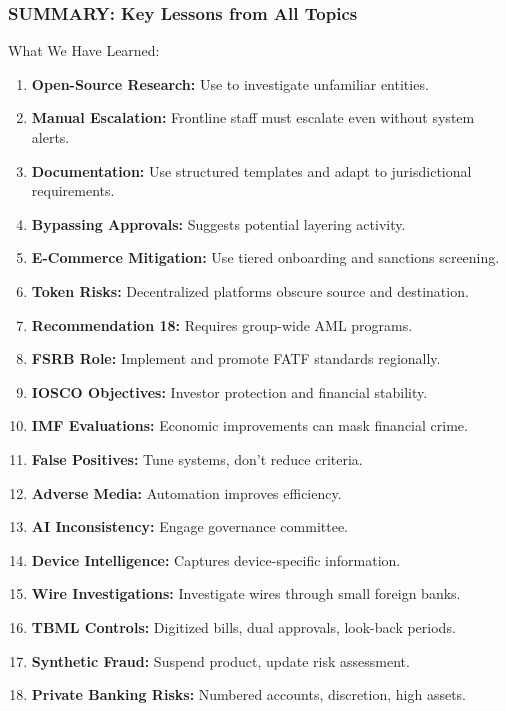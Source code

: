 \documentclass[12pt,aspectratio=169]{beamer}
\renewcommand{\footnotesize}{\fontsize{7}{8}\selectfont}
\renewcommand{\small}{\fontsize{8}{9}\selectfont}
\begin{document}
\begin{frame}
\frametitle{\fontsize{14}{17}\selectfont SUMMARY: Key Lessons from All Topics}

\small
\begin{block}{\fontsize{11}{13}\selectfont What We Have Learned:}
\footnotesize
\begin{enumerate}
    \item \textbf{Open-Source Research:} Use to investigate unfamiliar entities.
    \item \textbf{Manual Escalation:} Frontline staff must escalate even without system alerts.
    \item \textbf{Documentation:} Use structured templates and adapt to jurisdictional requirements.
    \item \textbf{Bypassing Approvals:} Suggests potential layering activity.
    \item \textbf{E-Commerce Mitigation:} Use tiered onboarding and sanctions screening.
    \item \textbf{Token Risks:} Decentralized platforms obscure source and destination.
    \item \textbf{Recommendation 18:} Requires group-wide AML programs.
    \item \textbf{FSRB Role:} Implement and promote FATF standards regionally.
    \item \textbf{IOSCO Objectives:} Investor protection and financial stability.
    \item \textbf{IMF Evaluations:} Economic improvements can mask financial crime.
    \item \textbf{False Positives:} Tune systems, don't reduce criteria.
    \item \textbf{Adverse Media:} Automation improves efficiency.
    \item \textbf{AI Inconsistency:} Engage governance committee.
    \item \textbf{Device Intelligence:} Captures device-specific information.
    \item \textbf{Wire Investigations:} Investigate wires through small foreign banks.
    \item \textbf{TBML Controls:} Digitized bills, dual approvals, look-back periods.
    \item \textbf{Synthetic Fraud:} Suspend product, update risk assessment.
    \item \textbf{Private Banking Risks:} Numbered accounts, discretion, high assets.

\end{enumerate}
\end{block}
\end{frame}
\end{document}
